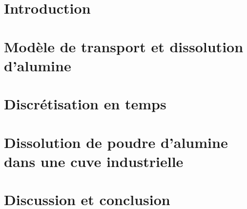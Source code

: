 \section{Introduction}
\label{sec:populations-introduction}


\section{Modèle de transport et dissolution d'alumine}
\label{sec:populations-model}


\section{Discrétisation en temps}
\label{sec:populations-discretisation}


\section{Dissolution de poudre d'alumine dans une cuve industrielle}
\label{sec:populations-industriel}


\section{Discussion et conclusion}
\label{sec:populations-conclusion}

